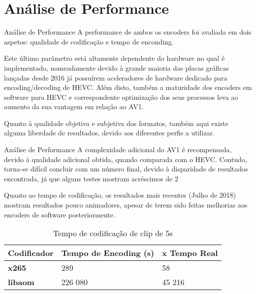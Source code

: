 \documentclass{beamer}
\begin{document}
\section{Análise de Performance}
\begin{frame}{Análise de Performance}
	A performance de ambos os encoders foi avaliada em dois aspetos: qualidade de codificação e tempo de enconding.

	Este último parâmetro está altamente dependente do hardware no qual é implementado, nomeadamente devido à grande maioria das placas gráficas lançadas desde 2016 já possuírem aceleradores de hardware dedicado para encoding/decoding de HEVC. Além disto, também a maturidade dos encoders em software para HEVC e correspondente optimização dos seus processos leva ao aumento da sua vantagem em relação ao AV1.

	Quanto à qualidade objetiva e subjetiva dos formatos, também aqui existe alguma liberdade de resultados, devido aos diferentes perfis a utilizar.
\end{frame}

\begin{frame}{Análise de Performance}
	A complexidade adicional do AV1 é recompensada, devido à qualidade adicional obtida, quando comparada com o HEVC. Contudo, torna-se difícil concluir com um número final, devido à disparidade de resultados encontrada, já que alguns testes mostram acréscimos de 2%

	Quanto ao tempo de codificação, os resultados mais recentes (Julho de 2018) mostram resultados pouco animadores, apesar de terem sido feitas melhorias aos encoders de software posteriormente.

	\begin{table}
		\centering
		\begin{tabular}{l|l|l}
			\textbf{Codificador}		 													& \textbf{Tempo de Encoding (s)} 	& \textbf{x Tempo Real} \\\hline
			\textbf{x265}																			& 289			 												& 58 \\
			\textbf{libaom}																		&	226 080													& 45 216 \\
		\end{tabular}
		\caption{\label{tab:time}Tempo de codificação de clip de 5s}
	\end{table}
\end{frame}

\end{document}
